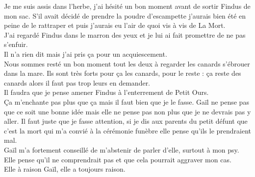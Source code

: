 Je me suis assis dans l'herbe, j'ai hésité un bon moment avant de sortir Findus de mon sac. S'il avait décidé de prendre la poudre d'escampette j'aurais bien été en peine de le rattraper et puis j'aurais eu l'air de quoi vis à vis de La Mort. \\
J'ai regardé Findus dans le marron des yeux et je lui ai fait promettre de ne pas s'enfuir. \\
Il n'a rien dit mais j'ai pris ça pour un acquiescement.\\

Nous sommes resté un bon moment tout les deux à regarder les canards s'ébrouer dans la mare. Ils sont très forts pour ça les canards, pour le reste : ça reste des canards alors il faut pas trop leurs en demander.\\

Il faudra que je pense amener Findus à l'enterrement de Petit Ours. \\
Ça m'enchante pas plus que ça mais il faut bien que je le fasse. Gaïl ne pense pas que ce soit une bonne idée mais elle ne pense pas non plus que je ne devrais pas y aller. Il faut juste que je fasse attention, si je dis aux parents du petit défunt que c'est la mort qui m'a convié à la cérémonie funèbre elle pense qu'ils le prendraient mal. \\
Gaïl m'a fortement conseillé de m'abstenir de parler d'elle, surtout à mon psy. Elle pense qu'il ne comprendrait pas et que cela pourrait aggraver mon cas. \\

Elle à raison Gaïl, elle a toujours raison.

